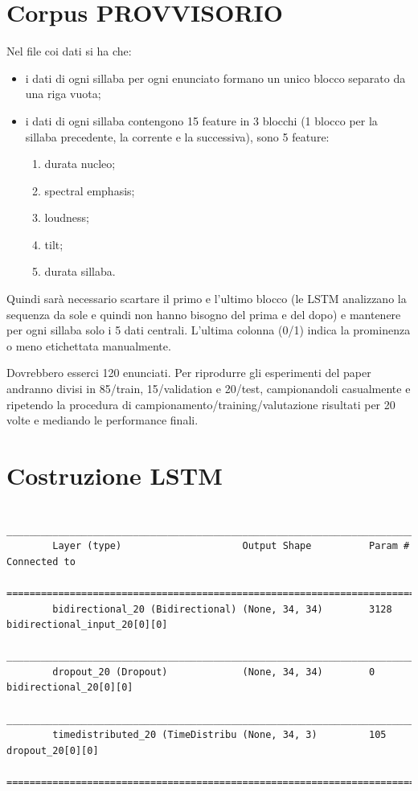 \documentclass[twoside,twocolumn,11pt]{extarticle}
\theoremstyle{definition}
\begin{document}
\section{Corpus PROVVISORIO}
	Nel file coi dati si ha che:
	\begin{itemize}
		\item i dati di ogni sillaba per ogni enunciato formano un unico blocco separato da una riga vuota;
		\item i dati di ogni sillaba contengono 15 feature in 3 blocchi (1 blocco per la sillaba precedente, la corrente e la successiva), sono 5 feature:
		\begin{enumerate}
			\item durata nucleo;
			\item spectral emphasis;
			\item loudness;
			\item tilt;
			\item durata sillaba.
		\end{enumerate}
	\end{itemize}
	Quindi sarà necessario scartare il primo e l'ultimo blocco (le LSTM analizzano la 
	sequenza da sole e quindi non hanno bisogno del prima e del dopo) e mantenere per ogni sillaba solo i 5 dati centrali. L'ultima colonna (0/1) indica la prominenza o meno etichettata manualmente.
	
	Dovrebbero esserci 120 enunciati. Per riprodurre gli esperimenti del paper \cite{bib:prominence-detection-italian} andranno divisi in 85/train, 15/validation e 20/test, campionandoli casualmente e ripetendo la procedura di campionamento/training/valutazione risultati per 20 volte e mediando le performance finali.
	
\section{Costruzione LSTM}
	\begin{verbatim}
		____________________________________________________________________________________________________
		Layer (type)                     Output Shape          Param #     Connected to                     
		====================================================================================================
		bidirectional_20 (Bidirectional) (None, 34, 34)        3128        bidirectional_input_20[0][0]     
		____________________________________________________________________________________________________
		dropout_20 (Dropout)             (None, 34, 34)        0           bidirectional_20[0][0]           
		____________________________________________________________________________________________________
		timedistributed_20 (TimeDistribu (None, 34, 3)         105         dropout_20[0][0]                 
		====================================================================================================
	\end{verbatim}
	
\end{document}
